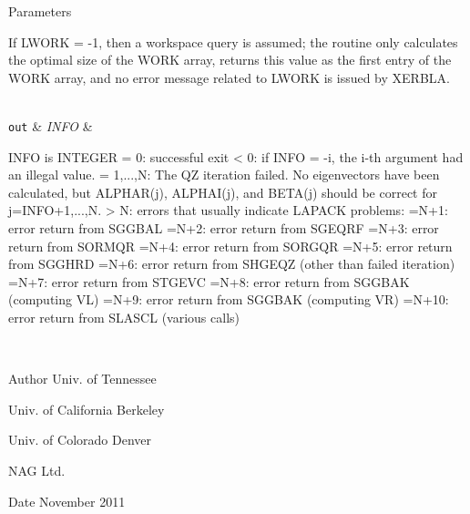 \begin{DoxyParams}[1]{Parameters}
\begin{DoxyVerb}
          If LWORK = -1, then a workspace query is assumed; the routine
          only calculates the optimal size of the WORK array, returns
          this value as the first entry of the WORK array, and no error
          message related to LWORK is issued by XERBLA.\end{DoxyVerb}
\\
\hline
\mbox{\tt out}  & {\em I\+N\+F\+O} & \begin{DoxyVerb}          INFO is INTEGER
          = 0:  successful exit
          < 0:  if INFO = -i, the i-th argument had an illegal value.
          = 1,...,N:
                The QZ iteration failed.  No eigenvectors have been
                calculated, but ALPHAR(j), ALPHAI(j), and BETA(j)
                should be correct for j=INFO+1,...,N.
          > N:  errors that usually indicate LAPACK problems:
                =N+1: error return from SGGBAL
                =N+2: error return from SGEQRF
                =N+3: error return from SORMQR
                =N+4: error return from SORGQR
                =N+5: error return from SGGHRD
                =N+6: error return from SHGEQZ (other than failed
                                                iteration)
                =N+7: error return from STGEVC
                =N+8: error return from SGGBAK (computing VL)
                =N+9: error return from SGGBAK (computing VR)
                =N+10: error return from SLASCL (various calls)\end{DoxyVerb}
 \\
\hline
\end{DoxyParams}
\begin{DoxyAuthor}{Author}
Univ. of Tennessee 

Univ. of California Berkeley 

Univ. of Colorado Denver 

N\+A\+G Ltd. 
\end{DoxyAuthor}
\begin{DoxyDate}{Date}
November 2011 
\end{DoxyDate}
